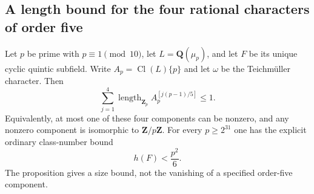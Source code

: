 \subsection{A length bound for the four rational characters of order five}

\begin{proposition}
Let $p$ be prime with $p\equiv1\pmod {10}$, let
$L=\mathbf Q(\mu_p)$, and let $F$ be its unique cyclic quintic
subfield.  Write $A_p=\operatorname{Cl}(L)\{p\}$ and let $\omega$
be the Teichm\"uller character.  Then
\[
 \sum_{j=1}^4
 \operatorname{length}_{\mathbf Z_p}
 A_p^{[j(p-1)/5]}\le1.                         \tag{O5.1}
\]
Equivalently, at most one of these four components can be nonzero,
and any nonzero component is isomorphic to $\mathbf Z/p\mathbf Z$.
For every $p\ge2^{31}$ one has the explicit ordinary class-number bound
\[
                         h(F)<\frac{p^2}{6}.   \tag{O5.2}
\]
The proposition gives a size bound, not the vanishing of a specified
order-five component.
\end{proposition}

